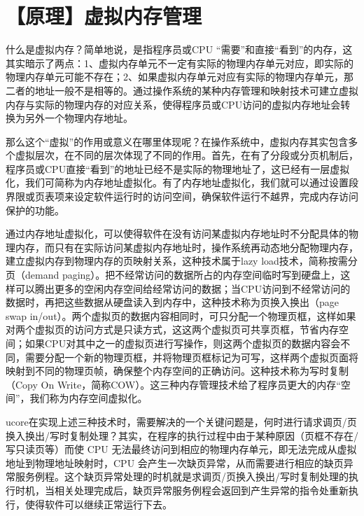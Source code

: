 \section{【原理】虚拟内存管理}\label{ux539fux7406ux865aux62dfux5185ux5b58ux7ba1ux7406}

什么是虚拟内存？简单地说，是指程序员或CPU
``需要''和直接``看到''的内存，这其实暗示了两点：1、虚拟内存单元不一定有实际的物理内存单元对应，即实际的物理内存单元可能不存在；2、如果虚拟内存单元对应有实际的物理内存单元，那二者的地址一般不是相等的。通过操作系统的某种内存管理和映射技术可建立虚拟内存与实际的物理内存的对应关系，使得程序员或CPU访问的虚拟内存地址会转换为另外一个物理内存地址。

那么这个``虚拟''的作用或意义在哪里体现呢？在操作系统中，虚拟内存其实包含多个虚拟层次，在不同的层次体现了不同的作用。首先，在有了分段或分页机制后，程序员或CPU直接``看到''的地址已经不是实际的物理地址了，这已经有一层虚拟化，我们可简称为内存地址虚拟化。有了内存地址虚拟化，我们就可以通过设置段界限或页表项来设定软件运行时的访问空间，确保软件运行不越界，完成内存访问保护的功能。

通过内存地址虚拟化，可以使得软件在没有访问某虚拟内存地址时不分配具体的物理内存，而只有在实际访问某虚拟内存地址时，操作系统再动态地分配物理内存，建立虚拟内存到物理内存的页映射关系，这种技术属于lazy
load技术，简称按需分页（demand
paging）。把不经常访问的数据所占的内存空间临时写到硬盘上，这样可以腾出更多的空闲内存空间给经常访问的数据；当CPU访问到不经常访问的数据时，再把这些数据从硬盘读入到内存中，这种技术称为页换入换出（page
swap
in/out）。两个虚拟页的数据内容相同时，可只分配一个物理页框，这样如果对两个虚拟页的访问方式是只读方式，这这两个虚拟页可共享页框，节省内存空间；如果CPU对其中之一的虚拟页进行写操作，则这两个虚拟页的数据内容会不同，需要分配一个新的物理页框，并将物理页框标记为可写，这样两个虚拟页面将映射到不同的物理页帧，确保整个内存空间的正确访问。这种技术称为写时复制（Copy
On
Write，简称COW）。这三种内存管理技术给了程序员更大的内存``空间''，我们称为内存空间虚拟化。

ucore在实现上述三种技术时，需要解决的一个关键问题是，何时进行请求调页/页换入换出/写时复制处理？其实，在程序的执行过程中由于某种原因（页框不存在/写只读页等）而使
CPU
无法最终访问到相应的物理内存单元，即无法完成从虚拟地址到物理地址映射时，CPU
会产生一次缺页异常，从而需要进行相应的缺页异常服务例程。这个缺页异常处理的时机就是求调页/页换入换出/写时复制处理的执行时机，当相关处理完成后，缺页异常服务例程会返回到产生异常的指令处重新执行，使得软件可以继续正常运行下去。
